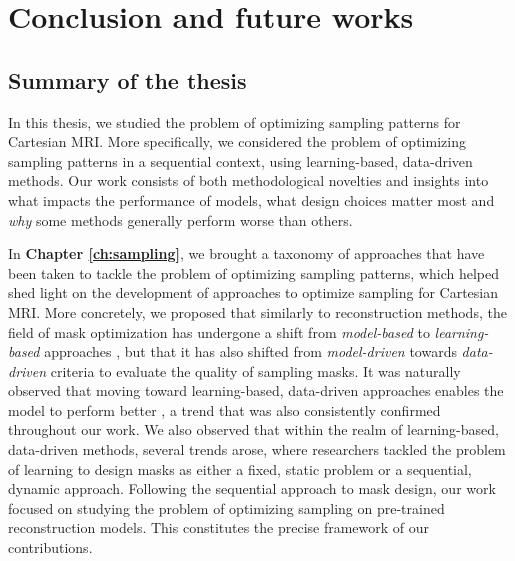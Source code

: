 \cleardoublepage
\chapter{Conclusion and future works}\label{ch:conclusion}

\section*{Summary of the thesis}

In this thesis, we studied the problem of optimizing sampling patterns for Cartesian MRI. More specifically, we considered the problem of optimizing sampling patterns in a sequential context, using learning-based, data-driven methods. Our work consists of both methodological novelties and insights into what impacts the performance of models, what design choices matter most and \textit{why} some methods generally perform worse than others. 

In \textbf{Chapter \ref{ch:sampling}}, we brought a taxonomy of approaches that have been taken to tackle the problem of optimizing sampling patterns, which helped shed light on the development of approaches to optimize sampling for Cartesian MRI. More concretely, we proposed that similarly to reconstruction methods, the field of mask optimization has undergone a shift from \textit{model-based} to \textit{learning-based} approaches \citep{ravishankar2019image,doneva2020mathematical}, but that it has also shifted from \textit{model-driven} towards \textit{data-driven} criteria to evaluate the quality of sampling masks. It was naturally observed that moving toward learning-based, data-driven approaches enables the model to perform better \citep{chauffert2013variable,zijlstra2016evaluation}, a trend that was also consistently confirmed throughout our work. We also observed that within the realm of learning-based, data-driven methods, several trends arose, where researchers tackled the problem of learning to design masks as either a fixed, static problem or a sequential, dynamic approach. Following the sequential approach to mask design, our work focused on studying the problem of optimizing sampling on pre-trained reconstruction models. This constitutes the precise framework of our contributions. 

